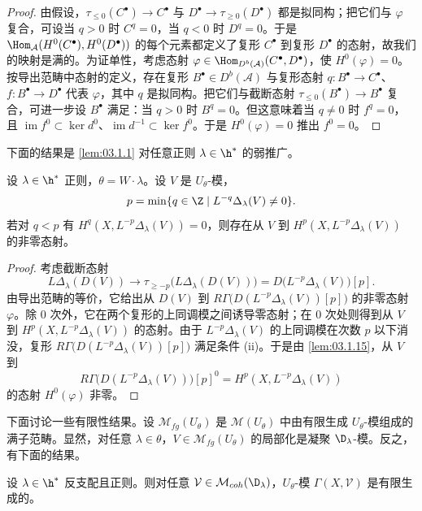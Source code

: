 \begin{proof}
由假设，$\tau_{\le 0}(C^\bullet)\to C^\bullet$ 与 $D^\bullet\to\tau_{\ge 0}(D^\bullet)$ 都是拟同构；把它们与 $\varphi$ 复合，可设当 $q>0$ 时 $C^q=0$，当 $q<0$ 时 $D^q=0$。于是 $\Hom_{\mathcal{A}}(H^0(C^\bullet),H^0(D^\bullet))$ 的每个元素都定义了复形 $C^\bullet$ 到复形 $D^\bullet$ 的态射，故我们的映射是满的。为证单性，考虑态射 $\varphi\in\Hom_{D^b(\mathcal{A})}(C^\bullet,D^\bullet)$，使 $H^0(\varphi)=0$。按导出范畴中态射的定义，存在复形 $B^\bullet\in D^b(\mathcal{A})$ 与复形态射 $q:B^\bullet\to C^\bullet$、$f:B^\bullet\to D^\bullet$ 代表 $\varphi$，其中 $q$ 是拟同构。把它们与截断态射 $\tau_{\le 0}(B^\bullet)\to B^\bullet$ 复合，可进一步设 $B^\bullet$ 满足：当 $q>0$ 时 $B^q=0$。但这意味着当 $q\ne 0$ 时 $f^q=0$，且 $\operatorname{im} f^0\subset\ker d^0$、$\operatorname{im} d^{-1}\subset\ker f^0$。于是 $H^0(\varphi)=0$ 推出 $f^0=0$。
\end{proof}

下面的结果是 \ref{lem:03.1.1} 对任意正则 $\lambda\in\h^*$ 的弱推广。

\begin{lemma}\label{lem:03.1.16}
设 $\lambda\in\h^*$ 正则，$\theta=W\cdot\lambda$。设 $V$ 是 $U_\theta$-模，
$$p=\min\{q\in\Z\mid L^{-q}\Delta_\lambda(V)\ne 0\}.$$
若对 $q<p$ 有 $H^q(X,L^{-p}\Delta_\lambda(V))=0$，则存在从 $V$ 到 $H^p(X,L^{-p}\Delta_\lambda(V))$ 的非零态射。
\end{lemma}

\begin{proof}
考虑截断态射
$$L\Delta_\lambda(D(V))\longrightarrow\tau_{\ge -p}\bigl(L\Delta_\lambda(D(V))\bigr)=D\bigl(L^{-p}\Delta_\lambda(V)\bigr)[p].$$
由导出范畴的等价，它给出从 $D(V)$ 到 $R\Gamma\bigl(D(L^{-p}\Delta_\lambda(V))[p]\bigr)$ 的非零态射 $\varphi$。除 $0$ 次外，它在两个复形的上同调模之间诱导零态射；在 $0$ 次处则得到从 $V$ 到 $H^p(X,L^{-p}\Delta_\lambda(V))$ 的态射。由于 $L^{-p}\Delta_\lambda(V)$ 的上同调模在次数 $p$ 以下消没，复形 $R\Gamma\bigl(D(L^{-p}\Delta_\lambda(V))[p]\bigr)$ 满足条件 (ii)。于是由 \ref{lem:03.1.15}，从 $V$ 到
$$R\Gamma\bigl(D(L^{-p}\Delta_\lambda(V))\bigr)[p]^0=H^p(X,L^{-p}\Delta_\lambda(V))$$
的态射 $H^0(\varphi)$ 非零。
\end{proof}

下面讨论一些有限性结果。设 $\mathcal{M}_{fg}(U_\theta)$ 是 $\mathcal{M}(U_\theta)$ 中由有限生成 $U_\theta$-模组成的满子范畴。显然，对任意 $\lambda\in\theta$，$V\in\mathcal{M}_{fg}(U_\theta)$ 的局部化是凝聚 $\D_\lambda$-模。反之，有下面的结果。

\begin{lemma}\label{lem:03.1.17}
设 $\lambda\in\h^*$ 反支配且正则。则对任意 $\mathcal{V}\in\mathcal{M}_{coh}(\D_\lambda)$，$U_\theta$-模 $\Gamma(X,\mathcal{V})$ 是有限生成的。
\end{lemma}

